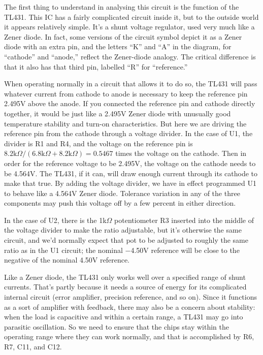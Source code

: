 The first thing to understand in analysing this circuit is the function of
the TL431.  This IC has a fairly complicated circuit inside it, but to the
outside world it appears relatively simple.  It's a shunt voltage regulator,
used very much like a Zener diode.  In fact, some versions of the circuit
symbol depict it as a Zener diode with an extra pin, and the letters ``K''
and ``A'' in the diagram, for ``cathode'' and ``anode,'' reflect the
Zener-diode analogy.  The critical difference is that it also has that third
pin, labelled ``R'' for ``reference.''

When operating normally in a circuit that allows it to do so, the TL431 will
pass whatever current from cathode to anode is necessary to keep the
reference pin 2.495V above the anode.  If you connected the reference pin
and cathode directly together, it would be just like a 2.495V Zener diode
with unusually good temperature stability and turn-on characteristics.  But
here we are driving the reference pin from the cathode through a voltage
divider.  In the case of U1, the divider is R1 and R4, and the voltage on
the reference pin is
$8.2\textrm{k}\Omega/(6.8\textrm{k}\Omega+8.2\textrm{k}\Omega)=0.5467$ times
the voltage on the cathode.  Then in order for the reference voltage to be
2.495V, the voltage on the cathode needs to be 4.564V\@.  The TL431, if it
can, will draw enough current through its cathode to make that true.  By
adding the voltage divider, we have in effect programmed U1 to behave like a
4.564V Zener diode.  Tolerance variation in any of the three components may
push this voltage off by a few percent in either direction.

In the case of U2, there is the 1k$\Omega$ potentiometer R3 inserted into the
middle of the voltage divider to make the ratio adjustable, but it's
otherwise the same circuit, and we'd normally expect that pot to be adjusted
to roughly the same ratio as in the U1 circuit; the nominal $-$4.50V reference
will be close to the negative of the nominal 4.50V reference.

Like a Zener diode, the TL431 only works well over a specified range of
shunt currents.  That's partly because it needs a source of energy for its
complicated internal circuit (error amplifier, precision reference, and so
on).  Since it functions as a sort of amplifier with feedback, there may
also be a concern about stability:  when the load is capacitive and within a
certain range, a TL431 may go into parasitic oscillation.  So we need to
ensure that the chips stay within the operating range where they can work
normally, and that is accomplished by R6, R7, C11, and C12.

